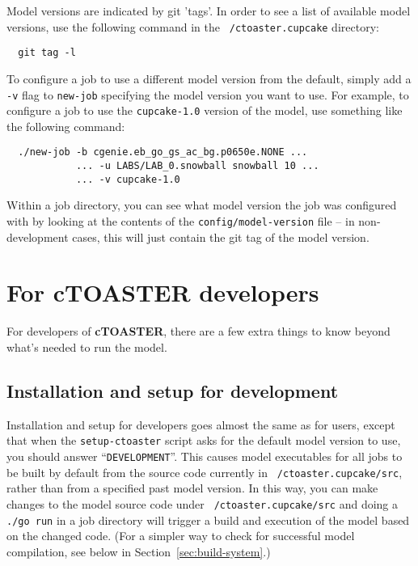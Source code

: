 \documentclass[a4paper,10pt,article]{memoir}
\begin{document}
Model versions are indicated by git 'tags'.  In order to see a list
of available model versions, use the following command in the
\texttt{~/ctoaster.cupcake} directory:
\begin{verbatim}
  git tag -l
\end{verbatim}
To configure a job to use a different model version from the default,
simply add a \texttt{-v} flag to \texttt{new-job} specifying the model
version you want to use.  For example, to configure a job to use the
\texttt{cupcake-1.0} version of the model, use something like the
following command:
\begin{verbatim}
  ./new-job -b cgenie.eb_go_gs_ac_bg.p0650e.NONE ...
            ... -u LABS/LAB_0.snowball snowball 10 ...
            ... -v cupcake-1.0
\end{verbatim}
Within a job directory, you can see what model version the job was
configured with by looking at the contents of the
\texttt{config/model-version} file -- in non-development cases, this
will just contain the git tag of the model version.

\newpage

\chapter{For cTOASTER developers}
\label{sec:genie-devs}

For developers of \textbf{cTOASTER}, there are a few extra things to know beyond
what's needed to run the model.

\section{Installation and setup for development}

Installation and setup for developers goes almost the same as for
users, except that when the \texttt{setup-ctoaster} script asks for the
default model version to use, you should answer
``\texttt{DEVELOPMENT}''.  This causes model executables for all jobs
to be built by default from the source code currently in
\texttt{~/ctoaster.cupcake/src}, rather than from a specified past model
version.  In this way, you can make changes to the model source code
under \texttt{~/ctoaster.cupcake/src} and doing a \texttt{./go run} in a job
directory will trigger a build and execution of the model based on the
changed code.  (For a simpler way to check for successful model
compilation, see below in Section~\ref{sec:build-system}.)
\end{document}
